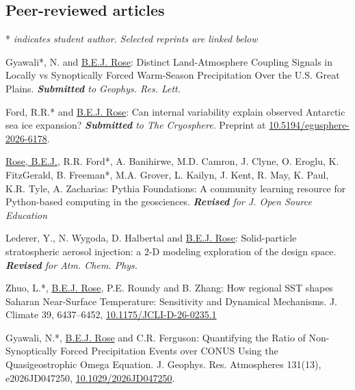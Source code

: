 \documentclass[11pt, letterpaper]{article} %
\newcommand{\years}[1]{\marginnote{\scriptsize #1}} %
\begin{document}
\subsection*{Peer-reviewed articles}
* \emph{indicates student author.} \emph{Selected reprints are linked below}
\vspace{0.2 cm}

\years{Under review, submitted, \& in prep.}

Gyawali*, N. and \underline{B.E.J. Rose}: Distinct Land-Atmosphere Coupling Signals in Locally vs Synoptically Forced Warm-Season Precipitation Over the U.S. Great Plains. \emph{\textbf{Submitted} to Geophys. Res. Lett.}
\vspace{0.2 cm}

Ford, R.R.* and \underline{B.E.J. Rose}: Can internal variability explain observed Antarctic sea ice expansion? \emph{\textbf{Submitted} to The Cryosphere}. Preprint at \href{https://doi.org/10.5194/egusphere-2026-6178}{10.5194/egusphere-2026-6178}.
\vspace{0.2 cm}

\underline{Rose, B.E.J.}, R.R. Ford*, A. Banihirwe, M.D. Camron, J. Clyne, O. Eroglu, K. FitzGerald, B. Freeman*, M.A. Grover, L. Kailyn, J. Kent, R. May, K. Paul, K.R. Tyle, A. Zacharias: Pythia Foundations: A community learning resource for Python-based computing in the geosciences. \emph{\textbf{Revised} for J. Open Source Education}
\vspace{0.2 cm}

Lederer, Y., N. Wygoda, D. Halbertal and \underline{B.E.J. Rose}: Solid-particle stratospheric aerosol injection: a 2-D modeling exploration of the design space. \emph{\textbf{Revised} for Atm. Chem. Phys.}
\vspace{0.2 cm}

\years{2026}

Zhuo, L.*, \underline{B.E.J. Rose}, P.E. Roundy and B. Zhang: How regional SST shapes Saharan Near-Surface Temperature: Sensitivity and Dynamical Mechanisms. J. Climate 39, 6437--6452, \href{https://doi.org/10.1175/JCLI-D-26-0235.1}{10.1175/JCLI-D-26-0235.1}
\vspace{0.2 cm}

Gyawali, N.*, \underline{B.E.J. Rose} and C.R. Ferguson: Quantifying the Ratio of Non-Synoptically Forced Precipitation Events over CONUS Using the Quasigeostrophic Omega Equation. J. Geophys. Res. Atmospheres 131(13), e2026JD047250, \href{https://doi.org/10.1029/2026JD047250}{10.1029/2026JD047250}.
\vspace{0.2 cm}
\end{document}
